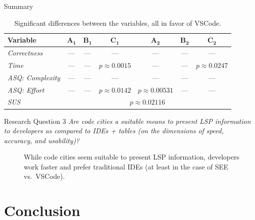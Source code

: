 \documentclass[xcolor={dvipsnames},aspectratio=169,compress]{beamer} %
\newcommand{\follows}{\raisebox{-0.7mm}{\scalebox{1.4}{\textcolor{Maroon}{\ding{43}}}}}
\newcommand{\answer}[1]{\begin{description}\item[\follows{}]{#1}\end{description}}
\begin{document}
\begin{frame}{Summary}
	\vspace{-0.3cm}
	\begin{table}
		\caption{Significant differences between the variables, all in favor of {VSCode}.}
		\centering
		\begin{tabular}{@{}lcccccc@{}}
			\toprule
			\textbf{Variable}        & $\bm{A_1}$                              & $\bm{B_1}$ & $ \bm{C_1}$        & $\bm{A_2}$          & $\bm{B_2}$ & $\bm{C_2}$         \\\midrule
			\emph{Correctness}       & ---                                     & ---        & ---                & ---                 & ---        & ---                \\
			\emph{Time}              & ---                                     & ---        & $p \approx 0.0015$ & ---                 & ---        & $p \approx 0.0247$ \\
			\emph{{ASQ}: Complexity} & ---                                     & ---        & ---                & ---                 & ---        & ---                \\
			\emph{{ASQ}: Effort}     & ---                                     & ---        & $p \approx 0.0142$ & $p \approx 0.00531$ & ---        & ---                \\
			\emph{{SUS}}             & \multicolumn{6}{c}{$p \approx 0.02116$}                                                                                           \\
			\bottomrule
		\end{tabular}
	\end{table}

	\begin{block}{Research Question 3}
		\emph{Are code cities a suitable means to present LSP information to developers as compared to IDEs + tables (on the dimensions of speed, accuracy, and usability)?}
		\answer{While code cities seem suitable to present LSP information, developers work faster and prefer traditional IDEs (at least in the case of SEE vs.\ VSCode).}
	\end{block}
\end{frame}

\section{Conclusion}
\end{document}
